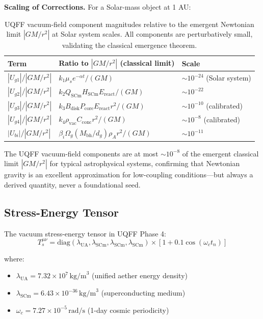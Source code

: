 \documentclass[12pt,a4paper]{article}
\begin{document}
\textbf{Scaling of Corrections.} For a Solar-mass object at 1 AU:
\begin{table}[H]
\centering
\begin{tabular}{@{}lll@{}}
\toprule
\textbf{Term} & \textbf{Ratio to $|GM/r^2|$ (classical limit)} & \textbf{Scale} \\
\midrule
$|U_{g1}|/|GM/r^2|$ & $k_1 \mu_s e^{-\alpha t} / (GM)$ & $\sim 10^{-24}$ (Solar system) \\
$|U_{g2}|/|GM/r^2|$ & $k_2 Q_{\mathrm{SCm}} H_{\mathrm{SCm}} E_{\mathrm{react}} / (GM)$ & $\sim 10^{-22}$ \\
$|U_{g3}|/|GM/r^2|$ & $k_3 B_{\mathrm{disk}} P_{\mathrm{core}} E_{\mathrm{react}} r^2 / (GM)$ & $\sim 10^{-10}$ (calibrated) \\
$|U_{g4}|/|GM/r^2|$ & $k_4 \rho_{\mathrm{vac}} C_{\mathrm{conc}} r^2 / (GM)$ & $\sim 10^{-8}$ (calibrated) \\
$|U_{bi}|/|GM/r^2|$ & $\beta_i \Omega_g (M_{\mathrm{bh}}/d_g) \rho_A r^2 / (GM)$ & $\sim 10^{-11}$ \\
\bottomrule
\end{tabular}
\caption{UQFF vacuum-field component magnitudes relative to the emergent Newtonian limit $|GM/r^2|$ at Solar system scales. All components are perturbatively small, validating the classical emergence theorem.}
\label{tab:newtonian_corrections}
\end{table}

The UQFF vacuum-field components are at most $\sim 10^{-8}$ of the emergent classical limit $|GM/r^2|$ for typical astrophysical systems, confirming that Newtonian gravity is an excellent approximation for low-coupling conditions---but always a derived quantity, never a foundational seed.

\subsection{Stress-Energy Tensor}

The vacuum stress-energy tensor in UQFF Phase 4:
\begin{equation}
T_s^{\mu\nu} = \text{diag}(\lambda_{\text{UA}}, \lambda_{\text{SCm}}, \lambda_{\text{SCm}}, \lambda_{\text{SCm}}) \times \left[1 + 0.1 \cos(\omega_c t_n)\right]
\label{eq:stress_energy}
\end{equation}

where:
\begin{itemize}
    \item $\lambda_{\text{UA}} = 7.32 \times 10^7\,\text{kg/m}^3$ (unified aether energy density)
    \item $\lambda_{\text{SCm}} = 6.43 \times 10^{-36}\,\text{kg/m}^3$ (superconducting medium)
    \item $\omega_c = 7.27 \times 10^{-5}\,\text{rad/s}$ (1-day cosmic periodicity)
\end{itemize}
\end{document}
